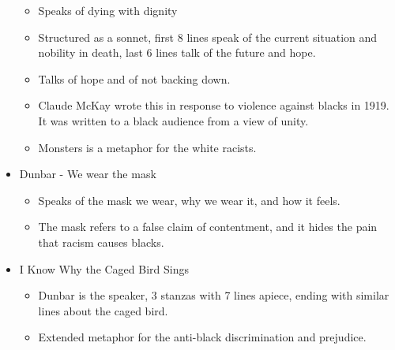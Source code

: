 \documentclass[10pt]{article}
\begin{document}
\begin{itemize}
\begin{itemize}
			\item Speaks of dying with dignity
			\item Structured as a sonnet, first 8
				lines speak of the current situation
				and nobility in death, last 6 lines talk
				of the future and hope.
			\item Talks of hope and of not backing
				down.
			\item Claude McKay wrote this in response to 
				violence against blacks in 1919.  It was
				written to a black audience from a view 
				of unity.
			\item Monsters is a metaphor for the white
				racists.
		\end{itemize}
	\item Dunbar - We wear the mask
		\begin{itemize}
			\item Speaks of the mask we wear, why we
				wear it, and how it feels.
			\item The mask refers to a false claim of
				contentment, and it hides the pain that
				racism causes blacks.
		\end{itemize}
	\item I Know Why the Caged Bird Sings
		\begin{itemize}
			\item Dunbar is the speaker, 3 stanzas with
				7 lines apiece, ending with similar lines
				about the caged bird.
			\item Extended metaphor for the anti-black
				discrimination and prejudice.
		\end{itemize}
\end{itemize}
\end{document}
